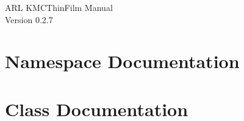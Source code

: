 \documentclass[letterpaper,twoside]{book}
\newcommand{\+}{\protect\hY{}}
\begin{document}
\hypersetup{pageanchor=false}
\begin{titlepage}
\vspace*{7cm}
\begin{center}
{\Large ARL KMCThin\+Film Manual}\\
\vspace*{1cm}
{\large Version 0.\+2.\+7}
\end{center}
\end{titlepage}
\tableofcontents
\clearpage
{}
\hypersetup{pageanchor=true}




\chapter{Namespace Documentation}





\chapter{Class Documentation}


















\end{document}
